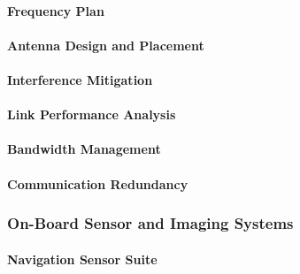 \paragraph{Frequency Plan}
\label{par:frequency_plan}


\paragraph{Antenna Design and Placement}
\label{par:antenna_design_placement}


\paragraph{Interference Mitigation}
\label{par:interference_mitigation}


\paragraph{Link Performance Analysis}
\label{par:link_performance_analysis}


\paragraph{Bandwidth Management}
\label{par:bandwidth_management}


\paragraph{Communication Redundancy}
\label{par:communication_redundancy}


\subsubsection{On-Board Sensor and Imaging Systems}
\label{subsubsec:onboard_sensor_imaging_systems}

\paragraph{Navigation Sensor Suite}
\label{par:navigation_sensor_suite}


